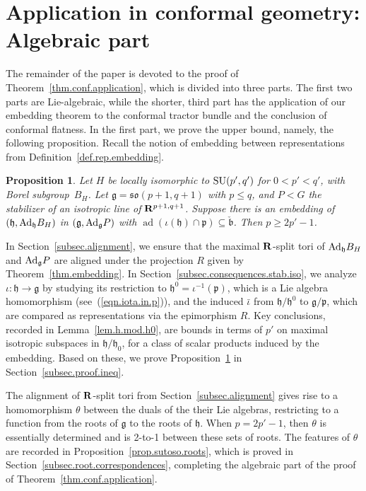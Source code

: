 \documentclass[pdftex]{sigma}
\numberwithin{equation}{section}
\newtheorem{prop}[thm]{Proposition}
\theoremstyle{definition}
\newcommand{\BR}{{\bf R}}
\newcommand{\lieg}{\mathfrak{g}}
\newcommand{\lieh}{\mathfrak{h}}
\def\g{{\mathfrak g}}
\def\h{{\mathfrak h}}
\def\p{{\mathfrak p}}
\def\b{{\mathfrak b}}
\newcommand{\so}{\mathfrak{so}}
\newcommand{\SU}{{\rm SU}}
\begin{document}
\section{Application in conformal geometry: Algebraic part}

The remainder of the paper is devoted to the proof of Theorem~\ref{thm.conf.application}, which is divided into three parts. The first two parts are Lie-algebraic, while the shorter, third part has the application of our embedding theorem to the conformal tractor bundle and the conclusion of conformal flatness. In the first part, we prove the upper bound, namely, the following proposition. Recall the notion of embedding between representations from Definition~\ref{def.rep.embedding}.

\begin{prop}
\label{prop.sutoso.ineq}
Let $H$ be locally isomorphic to $\SU(p',q')$ for $0 < p' < q'$, with Borel subgroup~$B_H$. Let $\lieg = \so(p+1,q+1)$ with $p \leq q$, and $P < G$ the stabilizer of an isotropic line of $\BR^{p+1,q+1}$. Suppose there is an embedding of~$(\lieh, {\rm Ad}_\h B_H)$ in $(\lieg, {\rm Ad}_\g P)$ with $\operatorname{ad}(\iota(\lieh) \cap \p ) \subseteq \check{\b}$. Then $p \geq 2 p'-1$.
\end{prop}

In Section~\ref{subsec.alignment}, we ensure that the maximal $\BR$-split tori of ${\rm Ad}_{\h} B_H$ and ${\rm Ad}_\g P$ are aligned under the projection $R$ given by Theorem~\ref{thm.embedding}. In Section~\ref{subsec.consequences.stab.iso}, we analyze $\iota\colon \h \rightarrow \g$ by studying its restriction to $\h^0 = \iota^{-1}(\p)$, which is a Lie algebra homomorphism (see~(\ref{eqn.iota.in.p})), and the induced $\bar{\iota}$ from $\h/\h^0$ to $\g/\p$, which are compared as representations via the epimorphism $R$. Key conclusions, recorded in Lemma~\ref{lem.h.mod.h0}, are bounds in terms of $p'$ on maximal isotropic subspaces in $\h/\h_0$, for a class of scalar products induced by the embedding. Based on these, we prove Proposition~\ref{prop.sutoso.ineq} in Section~\ref{subsec.proof.ineq}.

The alignment of $\BR$-split tori from Section~\ref{subsec.alignment} gives rise to a homomorphism $\theta$ between the duals of the their Lie algebras, restricting to a function from the roots of $\g$ to the roots of $\h$. When $p=2p'-1$, then $\theta$ is essentially determined and is 2-to-1 between these sets of roots. The features of $\theta$ are recorded in Proposition~\ref{prop.sutoso.roots}, which is proved in Section~\ref{subsec.root.correspondences}, completing the algebraic part of the proof of Theorem~\ref{thm.conf.application}.
\end{document}
